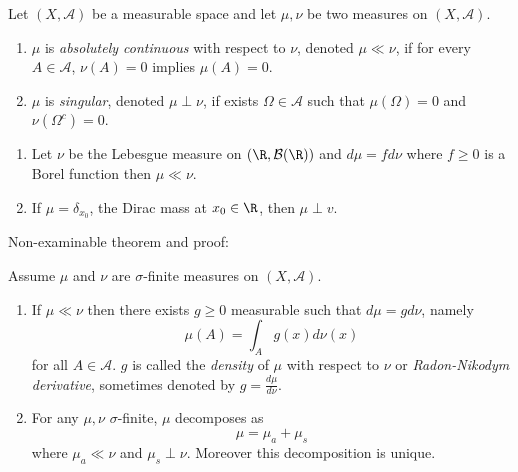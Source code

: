 \documentclass[a4paper]{article}
\begin{document}
\begin{definition}
  Let \((X, \mathcal A)\) be a measurable space and let \(\mu, \nu\) be two measures on \((X, \mathcal A)\).
  \begin{enumerate}
  \item \(\mu\) is \emph{absolutely continuous} with respect to \(\nu\), denoted \(\mu \ll \nu\), if for every \(A \in \mathcal A\), \(\nu(A) = 0\) implies \(\mu(A) = 0\).
  \item \(\mu\) is \emph{singular}, denoted \(\mu \perp \nu\), if exists \(\Omega \in \mathcal A\) such that \(\mu(\Omega) = 0\) and \(\nu(\Omega^c) = 0\).
  \end{enumerate}
\end{definition}

\begin{eg}\leavevmode
  \begin{enumerate}
  \item Let \(\nu\) be the Lebesgue measure on \((\R, \mathcal B(\R))\) and \(d\mu = fd\nu\) where \(f \geq 0\) is a Borel function then \(\mu \ll \nu\).
  \item If \(\mu = \delta_{x_0}\), the Dirac mass at \(x_0 \in \R\), then \(\mu \perp v\).
  \end{enumerate}
\end{eg}

Non-examinable theorem and proof:

\begin{theorem}
  Assume \(\mu\) and \(\nu\) are \(\sigma\)-finite measures on \((X, \mathcal A)\).
  \begin{enumerate}
  \item If \(\mu \ll \nu\) then there exists \(g \geq 0\) measurable such that \(d \mu = g d \nu\), namely
    \[
      \mu(A) = \int_A g(x) d \nu(x)
    \]
    for all \(A \in \mathcal A\). \(g\) is called the \emph{density} of \(\mu\) with respect to \(\nu\) or \emph{Radon-Nikodym derivative}, sometimes denoted by \(g = \frac{d\mu}{d\nu}\).
  \item For any \(\mu, \nu\) \(\sigma\)-finite, \(\mu\) decomposes as
    \[
      \mu = \mu_a + \mu_s
    \]
    where \(\mu_a \ll \nu\) and \(\mu_s \perp \nu\). Moreover this decomposition is unique.
  \end{enumerate}
\end{theorem}
\end{document}
